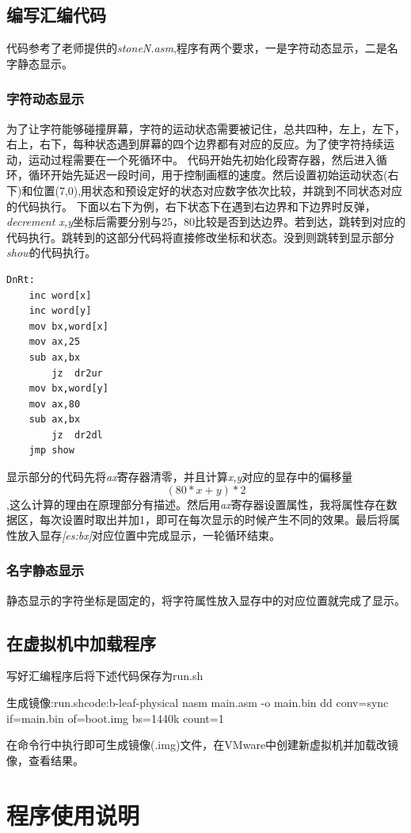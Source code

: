 \documentclass[a4paper, 11pt]{article} %
\newcounter{code}
\begin{document}
\subsection{编写汇编代码}
代码参考了老师提供的\textit{stoneN.asm},程序有两个要求，一是字符动态显示，二是名字静态显示。
\subsubsection{字符动态显示}
为了让字符能够碰撞屏幕，字符的运动状态需要被记住，总共四种，左上，左下，右上，右下，每种状态遇到屏幕的四个边界都有对应的反应。为了使字符持续运动，运动过程需要在一个死循环中。
代码开始先初始化段寄存器，然后进入循环，循环开始先延迟一段时间，用于控制画框的速度。然后设置初始运动状态(右下)和位置(7,0),用状态和预设定好的状态对应数字依次比较，并跳到不同状态对应的代码执行。
下面以右下为例，右下状态下在遇到右边界和下边界时反弹，\textit{decrement x,y}坐标后需要分别与25，80比较是否到达边界。若到达，跳转到对应的代码执行。跳转到的这部分代码将直接修改坐标和状态。没到则跳转到显示部分\textit{show}的代码执行。
\begin{lstlisting}[language={[x86masm]Assembler}]
DnRt:
	inc word[x]
	inc word[y]
	mov bx,word[x]
	mov ax,25
	sub ax,bx
		jz  dr2ur
	mov bx,word[y]
	mov ax,80
	sub ax,bx	
		jz  dr2dl
	jmp show
\end{lstlisting}
显示部分的代码先将\textit{ax}寄存器清零，并且计算\textit{x,y}对应的显存中的偏移量$$(80*x+y)*2$$,这么计算的理由在原理部分有描述。然后用\textit{ax}寄存器设置属性，我将属性存在数据区，每次设置时取出并加1，即可在每次显示的时候产生不同的效果。最后将属性放入显存\textit{[es:bx]}对应位置中完成显示，一轮循环结束。
\subsubsection{名字静态显示}
静态显示的字符坐标是固定的，将字符属性放入显存中的对应位置就完成了显示。

\subsection{在虚拟机中加载程序}

写好汇编程序后将下述代码保存为run.sh
\begin{code}{生成镜像:run.sh}{code:b-leaf-physical}
nasm main.asm -o main.bin
dd conv=sync if=main.bin of=boot.img bs=1440k count=1  
\end{code}
在命令行中执行即可生成镜像(.img)文件，在VMware中创建新虚拟机并加载改镜像，查看结果。

\section{程序使用说明}
\end{document}

